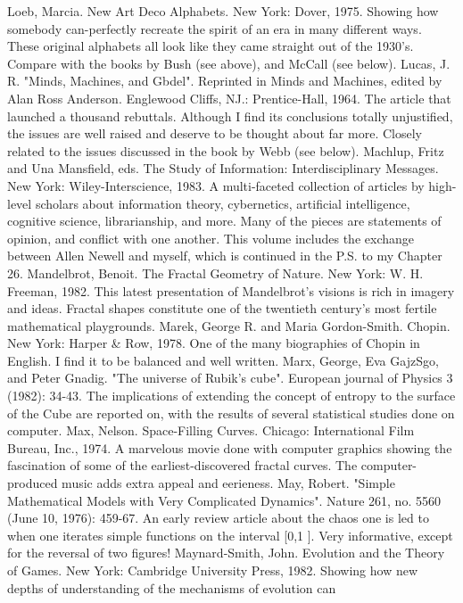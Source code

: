 Loeb, Marcia. New Art Deco Alphabets. New York: Dover, 1975. Showing how somebody
  can-perfectly recreate the spirit of an era in many different ways. These original alphabets
  all look like they came straight out of the 1930's. Compare with the books by Bush (see
  above), and McCall (see below).
Lucas, J. R. "Minds, Machines, and Gbdel". Reprinted in Minds and Machines, edited by
  Alan Ross Anderson. Englewood Cliffs, NJ.: Prentice-Hall, 1964. The article that launched
  a thousand rebuttals. Although I find its conclusions totally unjustified, the issues are well
  raised and deserve to be thought about far more. Closely related to the issues discussed in
  the book by Webb (see below).
Machlup, Fritz and Una Mansfield, eds. The Study of Information: Interdisciplinary
  Messages. New York: Wiley-Interscience, 1983. A multi-faceted collection of articles by
  high-level scholars about information theory, cybernetics, artificial intelligence, cognitive
  science, librarianship, and more. Many of the pieces are statements of opinion, and conflict
  with one another. This volume includes the exchange between Allen Newell and myself,
  which is continued in the P.S. to my Chapter 26.
Mandelbrot, Benoit. The Fractal Geometry of Nature. New York: W. H. Freeman, 1982. This
  latest presentation of Mandelbrot's visions is rich in imagery and ideas. Fractal shapes
  constitute one of the twentieth century's most fertile mathematical playgrounds.
Marek, George R. and Maria Gordon-Smith. Chopin. New York: Harper \& Row, 1978. One
  of the many biographies of Chopin in English. I find it to be balanced and well written.
Marx, George, Eva GajzSgo, and Peter Gnadig. "The universe of Rubik's cube". European
  journal of Physics 3 (1982): 34-43. The implications of extending the concept of entropy to
  the surface of the Cube are reported on, with the results of several statistical studies done on
  computer.
Max, Nelson. Space-Filling Curves. Chicago: International Film Bureau, Inc., 1974. A
  marvelous movie done with computer graphics showing the fascination of some of the
  earliest-discovered fractal curves. The computer-produced music adds extra appeal and
  eerieness.
May, Robert. "Simple Mathematical Models with Very Complicated Dynamics". Nature 261,
  no. 5560 (June 10, 1976): 459-67. An early review article about the chaos one is led to
  when one iterates simple functions on the interval [0,1 ]. Very informative, except for the
  reversal of two figures!
Maynard-Smith, John. Evolution and the Theory of Games. New York: Cambridge University
  Press, 1982. Showing how new depths of understanding of the mechanisms of evolution can
